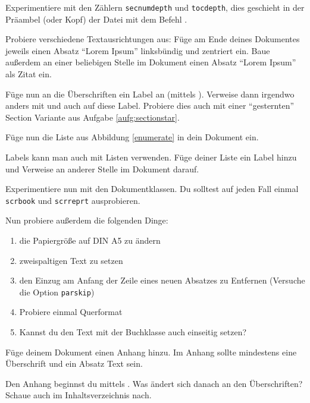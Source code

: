 \begin{uebung}
\item Experimentiere mit den Zählern \texttt{secnumdepth} und 
	\texttt{tocdepth}, dies geschieht in der Präambel (oder Kopf) der Datei mit dem
	Befehl . \label{zaehler}
\item Probiere verschiedene Textausrichtungen aus: Füge am Ende
    deines Dokumentes jeweils einen Absatz \enquote{Lorem Ipsum}
    linksbündig und zentriert ein. Baue außerdem an einer beliebigen Stelle
    im Dokument einen Absatz \enquote{Lorem Ipsum} als Zitat ein.
\item Füge nun an die Überschriften ein Label an (mittels ).
    Verweise dann irgendwo anders mit  und auch
     auf diese Label. Probiere dies auch mit einer \enquote{gesternten}
    Section Variante aus Aufgabe \ref{aufg:sectionstar}.
\item Füge nun die Liste aus Abbildung \ref{enumerate} in dein Dokument ein.
\item Labels kann man auch mit Listen verwenden. Füge deiner Liste ein Label
    hinzu und Verweise an anderer Stelle im Dokument darauf.
\item Experimentiere nun mit den Dokumentklassen. Du solltest auf jeden
    Fall einmal \texttt{scrbook} und \texttt{scrreprt} ausprobieren.
    
    Nun probiere außerdem die folgenden Dinge:
    \begin{enumerate}
        \item die Papiergröße auf DIN A5 zu ändern
        \item zweispaltigen Text zu setzen
        \item den Einzug am Anfang der Zeile eines neuen Absatzes zu
            Entfernen (Versuche die Option \texttt{parskip})
        \item Probiere einmal Querformat
        \item Kannst du den Text mit der Buchklasse auch einseitig setzen?
    \end{enumerate}
\item Füge deinem Dokument einen Anhang hinzu. Im Anhang sollte mindestens
    eine Überschrift und ein Absatz Text sein.
    \begin{hinweis}
        Den Anhang beginnst du mittels . Was ändert sich
        danach an den Überschriften? Schaue auch im Inhaltsverzeichnis nach.
    \end{hinweis}\label{markup:last}
\end{uebung}